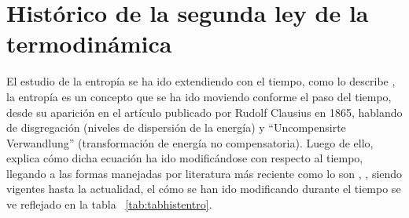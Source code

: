 %
%
%



\section{Histórico de la segunda ley de la termodinámica}

El estudio de la entropía  se ha ido extendiendo con el tiempo, como lo describe \textcite{eriyagi1}, la entropía es un concepto que se ha ido moviendo conforme el paso del tiempo, desde su aparición en el artículo publicado por Rudolf Clausius en 1865, hablando de disgregación (niveles de dispersión de la energía) y ``Uncompensirte Verwandlung'' (transformación de energía no compensatoria). Luego de ello, \textcite{florescamacho1} explica cómo dicha ecuación ha ido modificándose con respecto al tiempo, llegando a las formas manejadas por literatura más reciente como lo son \citeauthor{ccengel2006termodinamica}, \citeauthor{shapirotermo}, siendo vigentes hasta la actualidad, el cómo se han ido modificando durante el tiempo se ve reflejado en la tabla ~\ref{tab:tabhistentro}.
 

